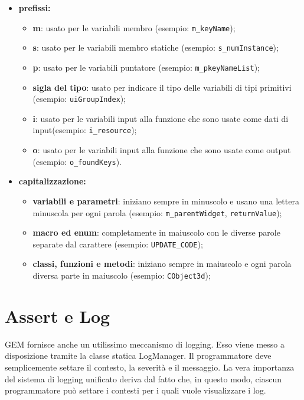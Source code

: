 \begin{itemize}
	\item \textbf{prefissi:}
	\begin{itemize}
		\item \textbf{m}: usato per le variabili membro (esempio: \texttt{m\_keyName});
		
		\item \textbf{s}: usato per le variabili membro statiche (esempio: \texttt{s\_numInstance});
		
		\item \textbf{p}: usato per le variabili puntatore (esempio: \texttt{m\_pkeyNameList});
		\item \textbf{sigla del tipo}: usato per indicare il tipo delle variabili di tipi primitivi (esempio: \texttt{uiGroupIndex});
		
		\item \textbf{i}: usato per le variabili input alla funzione che sono usate come dati di input(esempio: \texttt{i\_resource});
		
		\item \textbf{o}: usato per le variabili input alla funzione che sono usate come output (esempio: \texttt{o\_foundKeys}).
	\end{itemize}
	\item \textbf{capitalizzazione:}
	\begin{itemize}
		\item \textbf{variabili e parametri}: iniziano sempre in minuscolo e usano una lettera minuscola per ogni parola (esempio: \texttt{m\_parentWidget}, \texttt{returnValue});
		\item \textbf{macro ed enum}: completamente in maiuscolo con le diverse parole separate dal carattere \sq{\_} (esempio: \texttt{UPDATE\_CODE});
		\item \textbf{classi, funzioni e metodi}: iniziano sempre in maiuscolo e ogni parola diversa parte in maiuscolo (esempio: \texttt{CObject3d});
	\end{itemize}
\end{itemize}

\section{Assert e Log}

GEM fornisce anche un utilissimo meccanismo di logging. Esso viene messo a disposizione tramite la classe statica LogManager. Il programmatore deve semplicemente settare il contesto, la severità e il messaggio. La vera importanza del sistema di logging unificato deriva dal fatto che, in questo modo, ciascun programmatore può settare i contesti per i quali vuole visualizzare i log.\\

